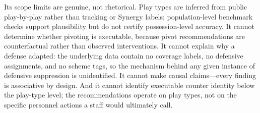 \documentclass[11pt]{article}
\begin{document}
Its scope limits are genuine, not rhetorical. Play types are inferred from public play-by-play rather than tracking or Synergy labels; population-level benchmark checks support plausibility but do not certify possession-level accuracy. It cannot determine whether pivoting is executable, because pivot recommendations are counterfactual rather than observed interventions. It cannot explain why a defense adapted: the underlying data contain no coverage labels, no defensive assignments, and no scheme tags, so the mechanism behind any given instance of defensive suppression is unidentified. It cannot make causal claims---every finding is associative by design. And it cannot identify executable counter identity below the play-type level; the recommendations operate on play types, not on the specific personnel actions a staff would ultimately call.
\end{document}
